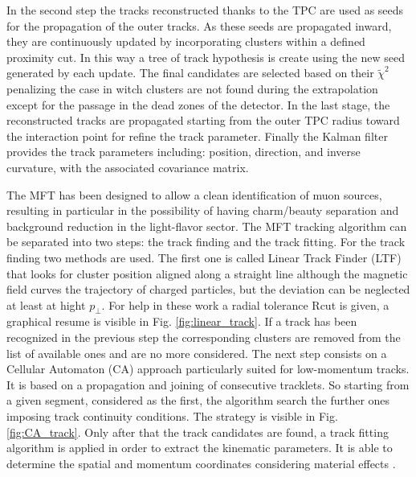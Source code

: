 \documentclass[12pt,a4paper]{book}
\begin{document}
In the second step the tracks reconstructed thanks to the TPC are used as seeds for the propagation of the outer tracks. As these seeds are propagated inward, they are continuously updated by  incorporating clusters within a defined proximity cut. In this way a tree of track hypothesis is create using the new seed generated by each update. The final candidates are selected based on their $\tilde{\chi}^2$ penalizing the case in witch clusters are not found during the extrapolation except for the passage in the dead zones of the detector. In the last stage, the reconstructed tracks are propagated starting from the outer TPC radius toward the interaction point for refine the track parameter. Finally the Kalman filter provides the track parameters including: position, direction, and inverse curvature, with the associated covariance matrix.    

 The MFT has been designed to allow a clean identification of muon sources, resulting in particular in the possibility of having charm/beauty separation and background reduction in the light-flavor sector. The MFT tracking algorithm can be separated into two steps: the track finding and the track fitting. For the track finding two methods are used. The first one is called Linear Track Finder (LTF) that looks for cluster position aligned along a straight line although the magnetic field curves the trajectory of charged particles, but the deviation can be neglected at least at hight $p_\perp$. For help in these work a radial tolerance Rcut is given, a graphical resume is visible in Fig. \ref{fig:linear_track}. If a track has been recognized in the previous step the corresponding clusters are removed from the list of available ones and are no more considered. The next step consists on a Cellular Automaton (CA) approach particularly suited for low-momentum tracks. It is based on a propagation and joining of consecutive tracklets. So starting from a given segment, considered as the first, the algorithm search the further ones imposing track continuity conditions. The strategy is visible in Fig. \ref{fig:CA_track}. Only after that the track candidates are found, a track fitting algorithm is applied in order to extract the kinematic parameters. It is able to determine the spatial and momentum coordinates considering material effects \cite{Herrmann:2920632}.
 
\end{document}
